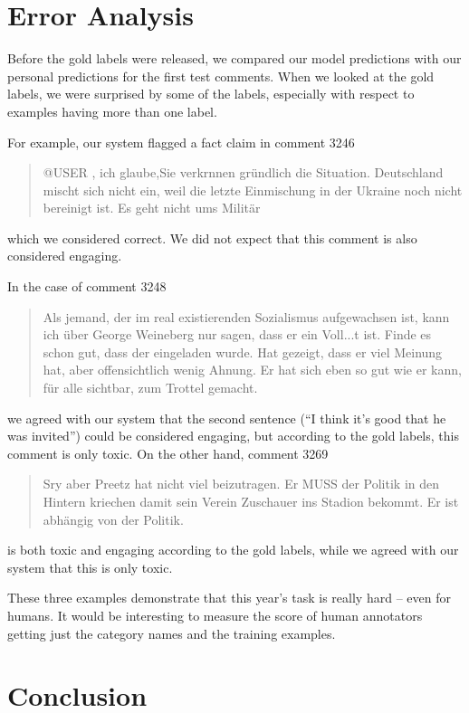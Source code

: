 \documentclass[11pt,a4paper]{article}
\begin{document}
 
\section{Error Analysis}
Before the gold labels were released, we compared our model predictions with our personal predictions for the first test comments.
When we looked at the gold labels, we were surprised by some of the labels, especially with respect to examples having more than one label.

For example, our system flagged a fact claim in comment 3246
\begin{quotation}
  @USER , ich glaube,Sie verkrnnen gr\"undlich die Situation. Deutschland mischt sich nicht ein, weil die letzte Einmischung in der Ukraine noch 
  nicht bereinigt ist. Es geht nicht ums Milit\"ar
\end{quotation}
which we considered correct. We did not expect that this comment is also considered engaging.

In the case of comment 3248
\begin{quotation}
  Als jemand, der im real existierenden Sozialismus aufgewachsen ist, kann ich \"uber George Weineberg nur sagen, dass er ein Voll...t ist. 
  Finde es schon gut, dass der eingeladen wurde. Hat gezeigt, dass er viel Meinung hat, aber offensichtlich wenig Ahnung. 
  Er hat sich eben so gut wie er kann, f\"ur alle sichtbar, zum Trottel gemacht.
\end{quotation}
we agreed with our system that the second sentence (``I think it's good that he was invited'') could be considered engaging, but according to
the gold labels, this comment is only toxic.
On the other hand, comment 3269
\begin{quotation}
  Sry aber Preetz hat nicht viel beizutragen. Er MUSS der Politik in den Hintern kriechen damit sein Verein Zuschauer ins Stadion bekommt. 
  Er ist abh\"angig von der Politik.
\end{quotation}
is both toxic and engaging according to the gold labels, while we agreed with our system that this is only toxic.

These three examples demonstrate that this year's task is really hard -- even for humans.
It would be interesting to measure the score of human annotators getting just the category names and the training examples. 

\section{Conclusion}
\end{document}

